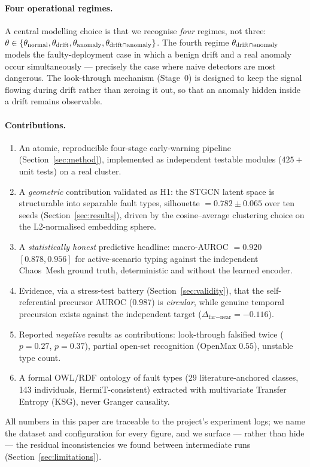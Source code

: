 \paragraph{Four operational regimes.}
A central modelling choice is that we recognise \emph{four} regimes, not three:
$\theta\in\{\theta_{\text{normal}},\theta_{\text{drift}},\theta_{\text{anomaly}},\theta_{\text{drift}\cap\text{anomaly}}\}$.
The fourth regime $\theta_{\text{drift}\cap\text{anomaly}}$ models the faulty-deployment case in which a benign drift and a real
anomaly occur simultaneously --- precisely the case where naive detectors are most dangerous.
The look-through mechanism (Stage~0) is designed to keep the signal flowing during drift rather
than zeroing it out, so that an anomaly hidden inside a drift remains observable.

\paragraph{Contributions.}
\begin{enumerate}\setlength{\itemsep}{1pt}
  \item An atomic, reproducible four-stage early-warning pipeline (Section~\ref{sec:method}),
        implemented as independent testable modules ($425{+}$ unit tests) on a real cluster.
  \item A \emph{geometric} contribution validated as H1: the STGCN latent space is structurable
        into separable fault types, silhouette $=0.782\pm0.065$ over ten seeds
        (Section~\ref{sec:results}), driven by the cosine--average clustering choice on the
        L2-normalised embedding sphere.
  \item A \emph{statistically honest} predictive headline: macro-AUROC $=0.920$
        $[0.878,0.956]$ for active-scenario typing against the independent Chaos~Mesh ground
        truth, deterministic and without the learned encoder.
  \item Evidence, via a stress-test battery (Section~\ref{sec:validity}), that the
        self-referential precursor AUROC ($0.987$) is \emph{circular}, while genuine temporal
        precursion exists against the independent target ($\Delta_{\text{far}-\text{near}}=-0.116$).
  \item Reported \emph{negative} results as contributions: look-through falsified twice
        ($p=0.27$, $p=0.37$), partial open-set recognition (OpenMax $0.55$), unstable type count.
  \item A formal OWL/RDF ontology of fault types (29 literature-anchored classes, 143
        individuals, HermiT-consistent) extracted with multivariate Transfer Entropy (KSG), never
        Granger causality.
\end{enumerate}

All numbers in this paper are traceable to the project's experiment logs; we name the dataset and
configuration for every figure, and we surface --- rather than hide --- the residual
inconsistencies we found between intermediate runs (Section~\ref{sec:limitations}).
